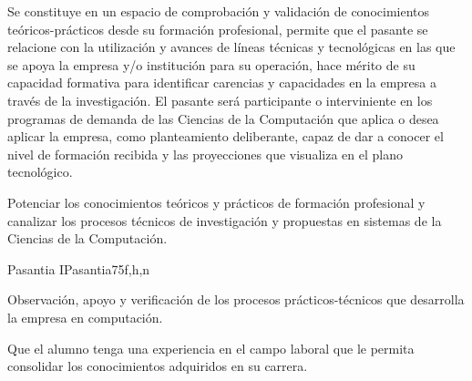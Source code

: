 \begin{syllabus}


\begin{justification}
Se constituye en un espacio de comprobación y validación de conocimientos teóricos-prácticos desde su formación profesional, permite que el pasante se relacione con la utilización y avances de líneas técnicas y tecnológicas en las que se apoya la empresa y/o institución para su operación, hace mérito de su capacidad formativa para identificar carencias y capacidades en la empresa a través de la investigación. El pasante será participante o interviniente en los programas de demanda de las Ciencias de la Computación que aplica o desea aplicar la empresa, como planteamiento deliberante, capaz de dar a conocer el nivel de formación recibida y las proyecciones que visualiza en el plano tecnológico.  
\end{justification}

\begin{goals}
\item Potenciar los conocimientos teóricos y prácticos de formación profesional y 
canalizar los procesos técnicos de investigación y propuestas en sistemas de la 
Ciencias de la Computación. 
\end{goals}

\begin{outcomes}
\end{outcomes}

\begin{unit}{Pasantia I}{Pasantia}{75}{f,h,n}
   \begin{topics}
      \item Observación, apoyo y verificación de los procesos prácticos-técnicos que desarrolla la empresa en computación.
   \end{topics}

   \begin{learningoutcomes}
      \item Que el alumno tenga una experiencia en el campo laboral que le permita consolidar los conocimientos adquiridos en su carrera.
   \end{learningoutcomes}
\end{unit}
   
\begin{coursebibliography}
\end{coursebibliography}
\end{syllabus}
